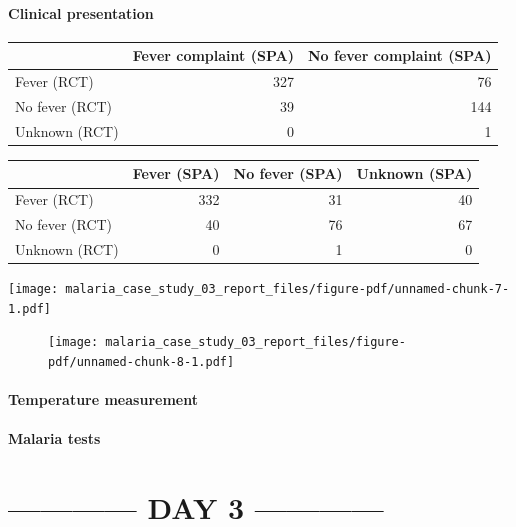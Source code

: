 \documentclass[
  letterpaper,
  DIV=11,
  numbers=noendperiod,
  oneside]{scrreprt}
\begin{document}
\hypertarget{clinical-presentation-1}{%
\subsection{Clinical presentation}\label{clinical-presentation-1}}

\begin{longtable}[]{@{}lrr@{}}
\toprule\noalign{}
& Fever complaint (SPA) & No fever complaint (SPA) \\
\midrule\noalign{}
\endhead
\bottomrule\noalign{}
\endlastfoot
Fever (RCT) & 327 & 76 \\
No fever (RCT) & 39 & 144 \\
Unknown (RCT) & 0 & 1 \\
\end{longtable}

\begin{longtable}[]{@{}lrrr@{}}
\toprule\noalign{}
& Fever (SPA) & No fever (SPA) & Unknown (SPA) \\
\midrule\noalign{}
\endhead
\bottomrule\noalign{}
\endlastfoot
Fever (RCT) & 332 & 31 & 40 \\
No fever (RCT) & 40 & 76 & 67 \\
Unknown (RCT) & 0 & 1 & 0 \\
\end{longtable}

\texttt{[image: malaria\_case\_study\_03\_report\_files/figure-pdf/unnamed-chunk-7-1.pdf]}

\begin{figure}

\texttt{[image: malaria\_case\_study\_03\_report\_files/figure-pdf/unnamed-chunk-8-1.pdf]}

\end{figure}

\hypertarget{temperature-measurement-1}{%
\subsection{Temperature measurement}\label{temperature-measurement-1}}

\hypertarget{malaria-tests-2}{%
\subsection{Malaria tests}\label{malaria-tests-2}}

\part{------------ DAY 3 ------------}
\end{document}
